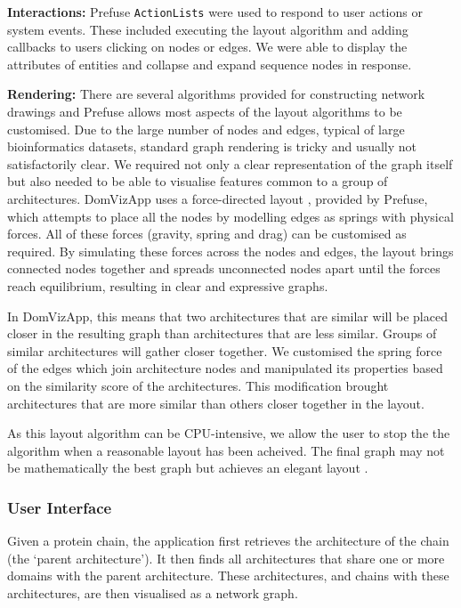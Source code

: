 \textbf{Interactions:} Prefuse \texttt{ActionLists} were used to respond to user actions or system events. These included executing the layout algorithm and adding callbacks to users clicking on nodes or edges. We were able to display the attributes of entities and collapse and expand sequence nodes in response.

\textbf{Rendering:} There are several algorithms provided for constructing network drawings and Prefuse allows most aspects of the layout algorithms to be customised. Due to the large number of nodes and edges, typical of large bioinformatics datasets, standard graph rendering is tricky and usually not satisfactorily clear. We required not only a clear representation of the graph itself but also needed to be able to visualise features common to a group of architectures. DomVizApp uses a force-directed layout \cite{force}, provided by Prefuse, which attempts to place all the nodes by modelling edges as springs with physical forces. All of these forces (gravity, spring and drag) can be customised as required. By simulating these forces across the nodes and edges, the layout brings connected nodes together and spreads unconnected nodes apart until the forces reach equilibrium, resulting in clear and expressive graphs. 

In DomVizApp, this means that two architectures that are similar will be placed closer in the resulting graph than architectures that are less similar. Groups of similar architectures will gather closer together. We customised the spring force of the edges which join architecture nodes and manipulated its properties based on the similarity score of the architectures. This modification brought architectures that are more similar than others closer together in the layout.

As this layout algorithm can be CPU-intensive, we allow the user to stop the the algorithm when a reasonable layout has been acheived. The final graph may not be mathematically the best graph but achieves an elegant layout \cite{force}.

\subsubsection{User Interface}
Given a protein chain, the application first retrieves the architecture of the chain (the `parent architecture'). It then finds all architectures that share one or more domains with the parent architecture.  These architectures, and chains with these architectures, are then visualised as a network graph.

